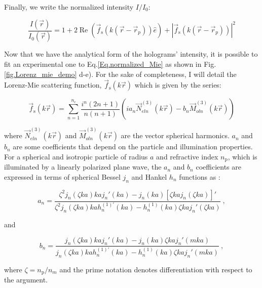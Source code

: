  Finally, we write the normalized intensity $I/I_0$:

\begin{equation}
	\frac{I(\vec{r})}{I_0(\vec{r})} = 1 + 2 \operatorname{Re} 
	\left(  
		\vec{f}_\mathrm{s}(k(\vec{r}- \vec{r}_p)) \hat{e}
	\right)
	+
	|
		\vec{f}_\mathrm{s}(k(\vec{r}- \vec{r}_p))
	|^2
	\label{Eq.normalized_Mie}	
\end{equation}


Now that we have the analytical form of the holograms' intensity, it is possible to fit an experimental one to Eq.\ref{Eq.normalized_Mie} as shown in Fig.\ref{fig.Lorenz_mie_demo} d-e). For the sake of completeness, I will detail the Lorenz-Mie scattering function, $\vec{f}_\mathrm{s}(k\vec{r})$ which is given by the series:

\begin{equation}
	\vec{f}_\mathrm{s}(k \vec{r}) = \sum _{n=1} ^{n_c} 
	\frac
	{
		i^n (2n +1)
	}
	{
		n(n+1)
	}
	\left(
		i a_n \vec{N}^{(3)}_{eln}(k\vec{r})
		-
		b_n \vec{M}^{(3)}_{oln}(k\vec{r})
	\right)
	\label{Eq.Lorenz-Mie-function}
\end{equation} 


where $\vec{N}^{(3)}_{eln}(k\vec{r})$ and $\vec{M}^{(3)}_{oln}(k\vec{r})$ are the vector spherical harmonics. $a_n$ and $b_n$ are some coefficients that depend on the particle and illumination properties. For a spherical and isotropic particle of radius $a$ and refractive index $n_\mathrm{p}$, which is illuminated by a linearly polarized plane wave, the $a_n$ and $b_n$ coefficients are expressed in terms of spherical Bessel $j_n$ and Hankel $h_n$ functions as \cite{f_bohren_absorption_1998}:

\begin{equation}
	a_n = 
	\frac
	{
		\zeta^2 j_n (\zeta k a)k a j_n' (k a) - j_n(ka)[\zeta kaj_n(\zeta ka)]'
	}
	{
		\zeta^2 j_n (\zeta k a)k a h_n^{(1)'} (k a) - h_n^{(1)}(ka)\zeta kaj_n'(\zeta ka)
	} ~,
	\label{Eq:an}
\end{equation}

and

\begin{equation}
	b_n =
	\frac
	{
		j_n(\zeta k a) kaj_n'(ka) - j_n (ka) \zeta kaj_n'(mka)
	}
	{
		j_n(\zeta k a) kah_n^{(1)'}(ka) - h_n^{(1)} (ka) \zeta kaj_n '(mka)
	} ~,
	\label{Eq:bn}
\end{equation}


where $\zeta = n_\mathrm{p} / n_m $ and the prime notation denotes differentiation with respect to the argument. 
	
